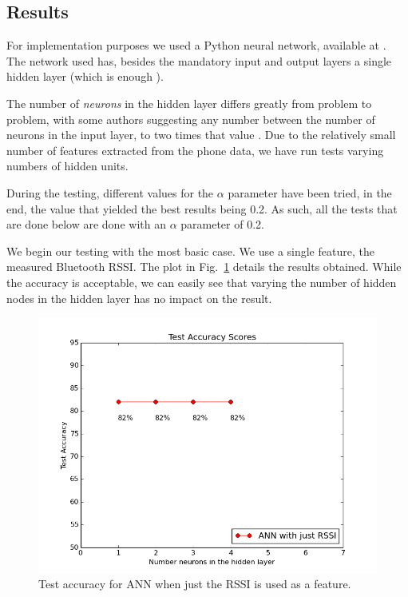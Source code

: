 \subsection{Results}

For implementation purposes we used a Python neural network, available at \cite{issam}. The network used has, besides the mandatory input and output layers a single hidden layer (which is enough \cite{Hornik1989359,Hartman,cybenko}). 

The number of \textit{neurons} in the hidden layer differs greatly from problem to problem, with some authors suggesting any number between the number of neurons in the input layer, to two times that value \cite{Stathakis}. Due to the relatively small number of features extracted from the phone data, we have run tests varying numbers of hidden units. 

During the testing, different values for the $\alpha$ parameter have been tried, in the end, the value that yielded the best results being 0.2. As such, all the tests that are done below are done with an $\alpha$ parameter of 0.2.

We begin our testing with the most basic case. We use a single feature, the measured Bluetooth RSSI. The plot in Fig.~\ref{pic:ann_single} details the results obtained. While the accuracy is acceptable, we can easily see that varying the number of hidden nodes in the hidden layer has no impact on the result. 

\begin{figure}[h]
	\begin{center}
		\includegraphics[scale=0.6]{figures/ann_simple.png}
	\end{center}
	
	\caption{Test accuracy for ANN when just the RSSI is used as a feature.}
	\label{pic:ann_single}

\end{figure}

